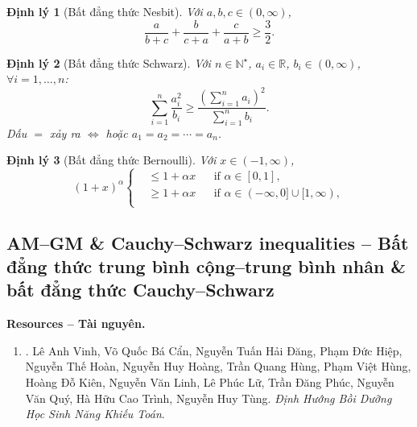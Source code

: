\documentclass{article}
\newtheorem{dinhly}{Định lý}
\begin{document}
\begin{dinhly}[Bất đẳng thức Nesbit]
	Với $a,b,c\in(0,\infty)$,
	\begin{equation}
		\label{Nesbit inequality}
		\tag{Nesbit}
		\frac{a}{b + c} + \frac{b}{c + a} + \frac{c}{a + b}\ge\frac{3}{2}.
	\end{equation}
\end{dinhly}

\begin{dinhly}[Bất đẳng thức Schwarz]
	Với $n\in\mathbb{N}^\star$, $a_i\in\mathbb{R}$, $b_i\in(0,\infty)$, $\forall i = 1,\ldots,n$:
	\begin{equation}
		\label{Schwarz inequality}
		\tag{Schwarz}
		\sum_{i=1}^n \frac{a_i^2}{b_i}\ge\frac{\left(\sum_{i=1}^n a_i\right)^2}{\sum_{i=1}^n b_i}.
	\end{equation}
	Dấu $=$ xảy ra $\Leftrightarrow$ hoặc $a_1 = a_2 = \cdots = a_n$.
\end{dinhly}

\begin{dinhly}[Bất đẳng thức Bernoulli]
	Với $x\in(-1,\infty)$,
	\begin{equation}
		\label{Bernoulli inequality}
		\tag{Bernoulli}
		(1 + x)^\alpha\left\{\begin{split}
			&\le1 + \alpha x&&\mbox{if }\alpha\in[0,1],\\
			&\ge1 + \alpha x&&\mbox{if }\alpha\in(-\infty,0]\cup[1,\infty),\\
		\end{split}\right.
	\end{equation}
\end{dinhly}

\subsection{AM--GM \& Cauchy--Schwarz inequalities -- Bất đẳng thức trung bình cộng--trung bình nhân \& bất đẳng thức Cauchy--Schwarz}
\textbf{\textsf{Resources -- Tài nguyên.}}
\begin{enumerate}
	\item \cite[Chap. 3: AM--GM \& Cauchy--Schwarz, pp. 55--80]{Vinh_dinh_huong_Olympic_Toan}. {\sc Lê Anh Vinh, Võ Quốc Bá Cẩn, Nguyễn Tuấn Hải Đăng, Phạm Đức Hiệp, Nguyễn Thế Hoàn, Nguyễn Huy Hoàng, Trần Quang Hùng, Phạm Việt Hùng, Hoàng Đỗ Kiên, Nguyễn Văn Linh, Lê Phúc Lữ, Trần Đăng Phúc, Nguyễn Văn Quý, Hà Hữu Cao Trình, Nguyễn Huy Tùng}. {\it Định Hướng Bồi Dưỡng Học Sinh Năng Khiếu Toán}.
\end{enumerate}
\end{document}
